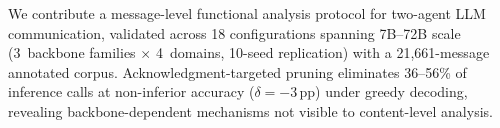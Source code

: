 We contribute a message-level functional analysis protocol for two-agent LLM communication, validated across 18 configurations spanning 7B--72B scale (3~backbone families $\times$ 4~domains, 10-seed replication) with a 21{,}661-message annotated corpus. Acknowledgment-targeted pruning eliminates 36--56\% of inference calls at non-inferior accuracy ($\delta{=}{-}3$\,pp) under greedy decoding, revealing backbone-dependent mechanisms not visible to content-level analysis.
